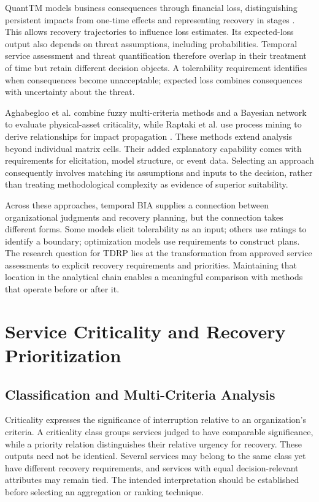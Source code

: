 

QuantTM models business consequences through financial loss, distinguishing persistent impacts from one-time effects and representing recovery in stages \cite{vonderassen2024quanttm}. This allows recovery trajectories to influence loss estimates. Its expected-loss output also depends on threat assumptions, including probabilities. Temporal service assessment and threat quantification therefore overlap in their treatment of time but retain different decision objects. A tolerability requirement identifies when consequences become unacceptable; expected loss combines consequences with uncertainty about the threat.

Aghabegloo et al. combine fuzzy multi-criteria methods and a Bayesian network to evaluate physical-asset criticality, while Raptaki et al. use process mining to derive relationships for impact propagation \cite{assetcriticality2023,raptaki2025propagation}. These methods extend analysis beyond individual matrix cells. Their added explanatory capability comes with requirements for elicitation, model structure, or event data. Selecting an approach consequently involves matching its assumptions and inputs to the decision, rather than treating methodological complexity as evidence of superior suitability.

Across these approaches, temporal BIA supplies a connection between organizational judgments and recovery planning, but the connection takes different forms. Some models elicit tolerability as an input; others use ratings to identify a boundary; optimization models use requirements to construct plans. The research question for TDRP lies at the transformation from approved service assessments to explicit recovery requirements and priorities. Maintaining that location in the analytical chain enables a meaningful comparison with methods that operate before or after it.

\section{Service Criticality and Recovery Prioritization}
\label{sec:lr_prioritization}

\subsection{Classification and Multi-Criteria Analysis}
\label{sec:lr_mcdm}

Criticality expresses the significance of interruption relative to an organization's criteria. A criticality class groups services judged to have comparable significance, while a priority relation distinguishes their relative urgency for recovery. These outputs need not be identical. Several services may belong to the same class yet have different recovery requirements, and services with equal decision-relevant attributes may remain tied. The intended interpretation should be established before selecting an aggregation or ranking technique.

